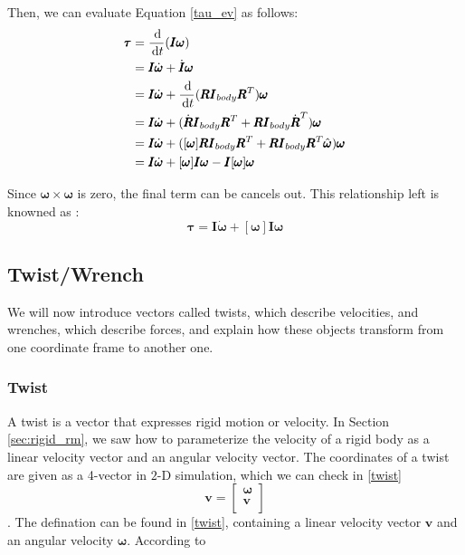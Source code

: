 Then, we can evaluate Equation \ref{tau_ev} as follows:
\begin{equation}
    \begin{aligned}
        \pmb{\tau} &= \frac{\,\mathrm{d}}{\,\mathrm{d} t}(\pmb{I}\pmb{\omega}) \\
        &= \pmb{I}\dot{\pmb{\omega}} + \dot{\pmb{I}}\pmb{\omega} \\
        &= \pmb{I}\dot{\pmb{\omega}} + \frac{\,\mathrm{d}}{\,\mathrm{d} t}(\pmb{R}\pmb{I}_{body}\pmb{R}^{T})\pmb{\omega} \\
        &= \pmb{I}\dot{\pmb{\omega}} + (\dot{\pmb{R}}\pmb{I}_{body}\pmb{R}^{T} + \pmb{R}\pmb{I}_{body}\dot{\pmb{R}}^{T})\pmb{\omega} \\
        &= \pmb{I}\dot{\pmb{\omega}} + ([\pmb{\omega}]\pmb{R}\pmb{I}_{body}\pmb{R}^{T} + \pmb{R}\pmb{I}_{body}\pmb{R}^{T} \hat{\pmb{\omega}})\pmb{\omega} \\
        &= \pmb{I}\dot{\pmb{\omega}} + [\pmb{\omega}]\pmb{I}\pmb{\omega} - \pmb{I}[\pmb{\omega}]\pmb{\omega}
    \end{aligned}
    \label{tau_ev}
\end{equation}

Since $\pmb{\omega} \times \pmb{\omega}$ is zero, the final term can be cancels out. This relationship left is knowned as :
\begin{equation}
    \pmb{\tau} = \pmb{I}\dot{\pmb{\omega}} + [\pmb{\omega}]\pmb{I}\pmb{\omega}
    \label{tau}
\end{equation}

\subsection{Twist/Wrench}
We will now introduce vectors called twists, which describe velocities, and wrenches, which describe forces, and explain how these objects transform from one coordinate frame to another one. 
    \subsubsection{Twist} 
        A twist is a vector that expresses rigid motion or velocity. In Section \ref{sec:rigid_rm}, we saw how to parameterize the velocity of a rigid body as a linear velocity vector and an angular velocity vector. The coordinates of a twist are given as a 4-vector in $2$-D simulation, which we can check in \ref{twist}
            \begin{equation}
                \mathbf{v} = \left[ \begin{array}{c} \pmb{\omega} \\ \pmb{v} \\ \end{array} \right]
                \label{twist}
            \end{equation}.
        The defination can be found in \ref{twist}, containing a linear velocity vector \(\pmb{v}\) and an angular velocity \(\pmb{\omega}\). According to 

